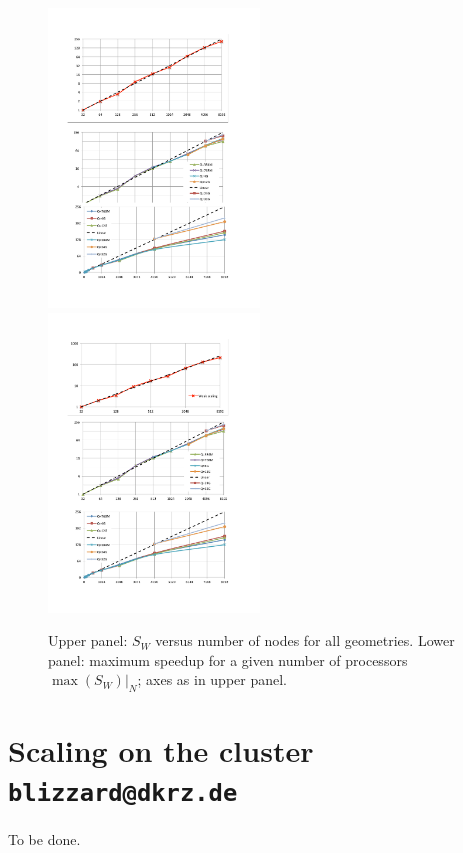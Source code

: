 \begin{figure}
  \begin{centering}
  \includegraphics[width=0.5\textwidth]{figs/weak_scaling1.pdf}%
  \includegraphics[width=0.5\textwidth]{figs/weak_scaling2.pdf}\\
  \end{centering}
  \caption{Upper panel: $S_W$ versus number of nodes for all geometries. Lower
    panel: maximum speedup for a given number of processors $\max(S_W)|_N$; axes
    as in upper panel.  }
  \label{fig:v_scaling2} 
\end{figure}

\section{Scaling on the cluster \texttt{blizzard@dkrz.de}}

To be done.
